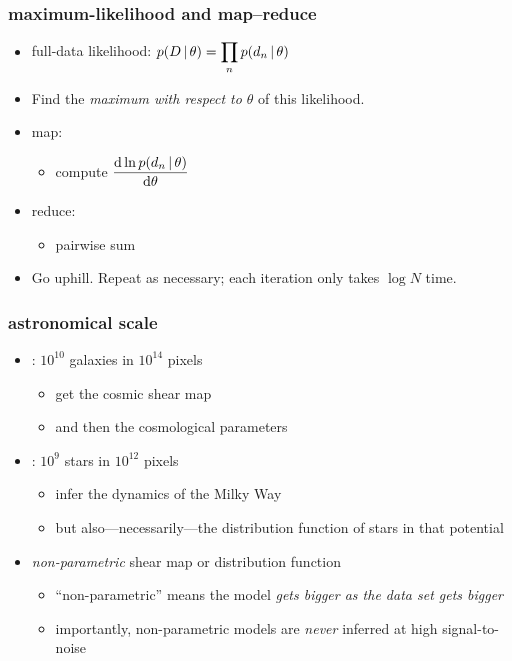 \documentclass[pdftex]{beamer}
\begin{document}
\begin{frame}
  \frametitle{maximum-likelihood and map--reduce}
  \begin{itemize}
  \item full-data likelihood: $\displaystyle p(D\,|\,\theta) =
    \prod_n p(d_n\,|\,\theta)$
  \item Find the \emph{maximum with respect to $\theta$} of this
    likelihood.
  \item map:
    \begin{itemize}
    \item compute $\displaystyle\frac{\mathrm{d} \ln p(d_n\,|\,\theta)}{\mathrm{d}\theta}$
    \end{itemize}
  \item reduce:
    \begin{itemize}
    \item pairwise sum
    \end{itemize}
  \item Go uphill.  Repeat as necessary; each iteration only takes
    $\log N$ time.
  \end{itemize}
\end{frame}

\begin{frame}
  \frametitle{astronomical scale}
  \begin{itemize}
  \item \lsst: $10^{10}$ galaxies in $10^{14}$ pixels
    \begin{itemize}
    \item get the cosmic shear map
    \item and then the cosmological parameters
    \end{itemize}
  \item \gaia: $10^{9}$ stars in $10^{12}$ pixels
    \begin{itemize}
    \item infer the dynamics of the Milky Way
    \item but also---necessarily---the distribution function of stars
      in that potential
    \end{itemize}
  \item \emph{non-parametric} shear map or distribution function
    \begin{itemize}
    \item ``non-parametric'' means the model \emph{gets bigger as the
      data set gets bigger}
    \item importantly, non-parametric models are \emph{never} inferred
      at high signal-to-noise
    \end{itemize}
  \end{itemize}
\end{frame}
\end{document}
